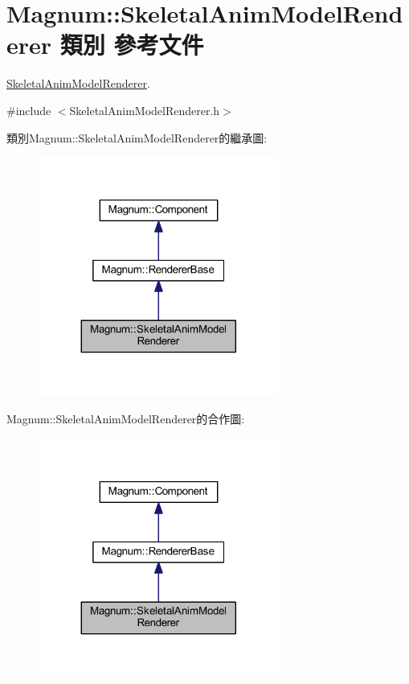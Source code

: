 \hypertarget{class_magnum_1_1_skeletal_anim_model_renderer}{}\section{Magnum\+:\+:Skeletal\+Anim\+Model\+Renderer 類別 參考文件}
\label{class_magnum_1_1_skeletal_anim_model_renderer}


\hyperlink{class_magnum_1_1_skeletal_anim_model_renderer}{Skeletal\+Anim\+Model\+Renderer}.  




{\ttfamily \#include $<$Skeletal\+Anim\+Model\+Renderer.\+h$>$}



類別\+Magnum\+:\+:Skeletal\+Anim\+Model\+Renderer的繼承圖\+:\nopagebreak
\begin{figure}[H]
\begin{center}
\leavevmode
\includegraphics[width=224pt]{class_magnum_1_1_skeletal_anim_model_renderer__inherit__graph}
\end{center}
\end{figure}


Magnum\+:\+:Skeletal\+Anim\+Model\+Renderer的合作圖\+:\nopagebreak
\begin{figure}[H]
\begin{center}
\leavevmode
\includegraphics[width=224pt]{class_magnum_1_1_skeletal_anim_model_renderer__coll__graph}
\end{center}
\end{figure}
